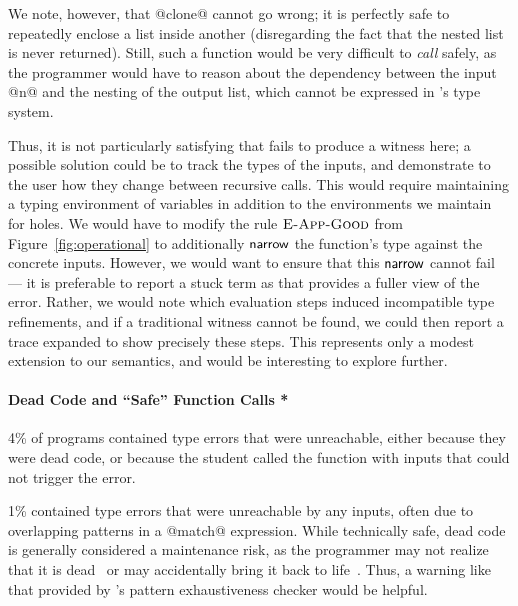 We note, however, that @clone@ cannot go wrong; it is perfectly safe to
repeatedly enclose a list inside another (disregarding the fact that the
nested list is never returned).
%
Still, such a function would be very difficult to \emph{call} safely, as
the programmer would have to reason about the dependency between the
input @n@ and the nesting of the output list, which cannot be expressed
in \ocaml's type system.

Thus, it is not particularly satisfying that \toolname fails to produce
a witness here; a possible solution could be to track the types of the
inputs, and demonstrate to the user how they change between recursive
calls.
%
This would require maintaining a typing environment of variables in
addition to the environments we maintain for holes.
%
We would have to modify the rule $\textsc{E-App-Good}$ from
Figure~\ref{fig:operational} to additionally $\mathsf{narrow}$ the function's
type against the concrete inputs.
%
However, we would want to ensure that this $\mathsf{narrow}$ cannot fail ---
it is preferable to report a stuck term as that provides a fuller view
of the error.
%
Rather, we would note which evaluation steps induced incompatible
type refinements, and if a traditional witness cannot be found, we could
then report a trace expanded to show precisely these steps.
%
This represents only a modest extension to our semantics, and would be
interesting to explore further.

\paragraph{Dead Code and ``Safe'' Function Calls *}
%
4\% of programs contained type errors that were unreachable, either
because they were dead code, or because the student called the function
with inputs that could not trigger the error.


1\% contained type errors that were unreachable by any inputs, often due
to overlapping patterns in a @match@ expression.
%
%
While technically safe, dead code is generally considered a maintenance
risk, as the programmer may not realize that it is dead~\cite{Wheeler2014-fg}
or may accidentally bring it back to life~\cite{Seven2014-gf}.
%
Thus, a warning like that provided by \ocaml's pattern exhaustiveness
checker would be helpful.

